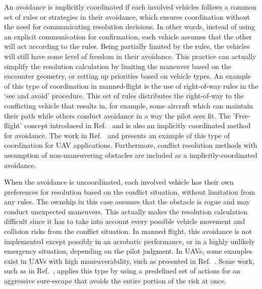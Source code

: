 An avoidance is implicitly coordinated if each involved vehicles follows a common set of rules or strategies in their avoidance, which ensures coordination without the need for communicating resolution decisions. In other words, instead of using an explicit communication for confirmation, each vehicle assumes that the other will act according to the rules. Being partially limited by the rules, the vehicles will still have some level of freedom in their avoidance. This practice can actually simplify the resolution calculation by limiting the maneuver based on the encounter geometry, or setting up priorities based on vehicle types. An example of this type of coordination in manned-flight is the use of right-of-way rules in the `see and avoid' procedure\cite{FAR:91}. This set of rules distributes the right-of-way to the conflicting vehicle that results in, for example, some aircraft which can maintain their path while others conduct avoidance in a way the pilot sees fit\cite{FAR:91}. The 'Free-flight' concept introduced in Ref.~\cite{Hoekstra:01} and \cite{Hoekstra:02} is also an implicitly coordinated method for avoidance. The work in Ref.~\cite{LeTallec:05} and \cite{Jenie:13b} presents an example of this type of coordination for UAV applications. Furthermore, conflict resolution methods with assumption of non-maneuvering obstacles are included as a implicitly-coordinated avoidance.

When the avoidance is uncoordinated, each involved vehicle has their own preferences for resolution based on the conflict situation, without limitation from any rules. The ownship in this case assumes that the obstacle is rogue and may conduct unexpected maneuvers. This actually makes the resolution calculation difficult since it has to take into account every possible vehicle movement and collision risks from the conflict situation. In manned flight, this avoidance is not implemented except possibly in an acrobatic performance, or in a highly unlikely emergency situation, depending on the pilot judgment. In UAVs, some examples exist in UAVs with high maneuverability, such as presented in Ref.~\cite{Teo:04}. Some work, such as in Ref.~\cite{Winder:99}, applies this type by using a predefined set of actions for an aggressive sure-escape that avoids the entire portion of the risk at once.


